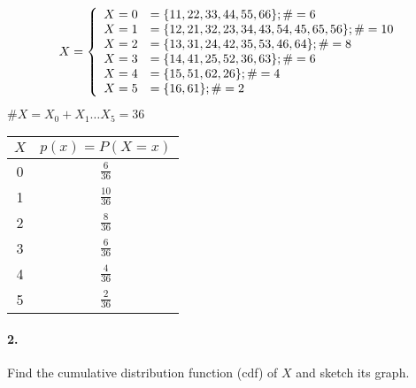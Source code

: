     \begin{mdframed}
            \begin{equation*}
                X = \left\{
                    \begin{array}{r l}
                        X = 0 & = \{11, 22, 33, 44, 55, 66\}; \# = 6  \\
                        X = 1 & = \{12, 21, 32, 23, 34, 43, 54, 45, 65, 56\}; \# = 10  \\
                        X = 2 & = \{13, 31, 24, 42, 35, 53, 46, 64\}; \# = 8  \\
                        X = 3 & = \{14, 41, 25, 52, 36, 63\}; \# = 6  \\
                        X = 4 & = \{15, 51, 62, 26\}; \# = 4  \\
                        X = 5 & = \{16, 61\}; \# = 2  \\
                    \end{array}
                \right.
            \end{equation*}

            $\#X = X_0 + X_1 \dots X_5 = 36$

            \centering
            \begin{tabular}{c | c }
                $X$ & $p(x) = P(X = x)$    \\
                \hline
                0 & $\frac{6}{36}$  \\
                \hline
                1 & $\frac{10}{36}$ \\
                \hline
                2 & $\frac{8}{36}$  \\
                \hline
                3 & $\frac{6}{36} $ \\
                \hline
                4 & $\frac{4}{36}$  \\
                \hline
                5 & $\frac{2}{36}$  \\
            \end{tabular}
    \end{mdframed}

    \paragraph*{2.}
    Find the cumulative distribution function (cdf) of $X$ and sketch its graph.

